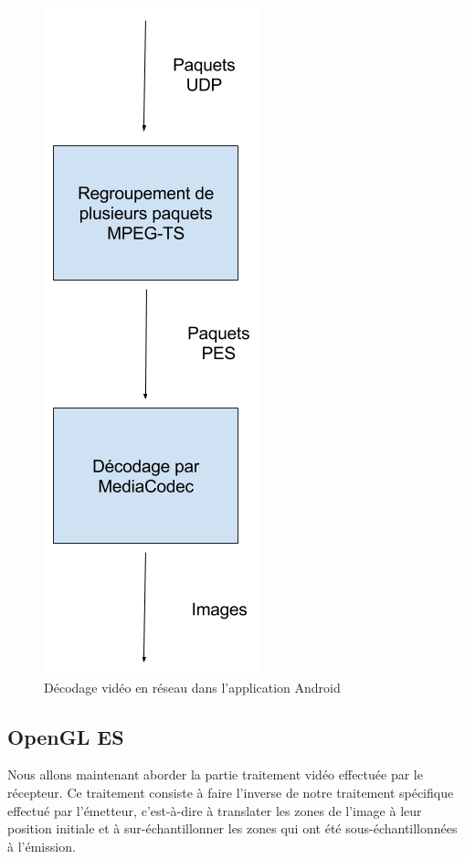\documentclass[11pt,a4paper]{article}
\begin{document}
\begin{figure}[H]
\begin{center}
\includegraphics[scale=0.35]{images/decodage_video.png}
\end{center}
\caption{Décodage vidéo en réseau dans l'application Android}
\label{}
\end{figure}


\subsection{OpenGL ES}
Nous allons maintenant aborder la partie traitement vidéo effectuée par le récepteur.
Ce traitement consiste à faire l'inverse de notre traitement spécifique effectué par l'émetteur, c'est-à-dire à translater les zones de l'image à leur position initiale et à sur-échantillonner les zones qui ont été sous-échantillonnées à l'émission.
\end{document}
